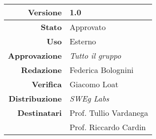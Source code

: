 \begin{center}
\begin{tabular}{r|l}
    \textbf{Versione} & 1.0 \\
    \hline
    \textbf{Stato} & Approvato \\
    \hline
    \textbf{Uso} & Esterno \\
    \hline
    \textbf{Approvazione} & \emph{Tutto il gruppo} \\
    \hline
    \textbf{Redazione} & Federica Bolognini \\
    \hline
    \textbf{Verifica} & Giacomo Loat \\
    \hline
    \textbf{Distribuzione} & \emph{SWEg Labs} \\
    \hline
    \textbf{Destinatari} & Prof. Tullio Vardanega \\
                         & Prof. Riccardo Cardin \\
\end{tabular}
\end{center}

